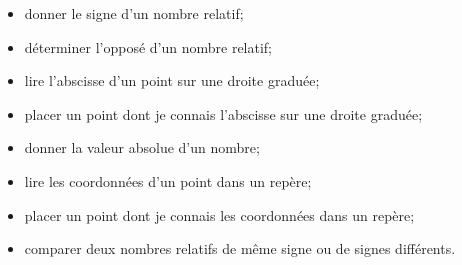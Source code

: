 \begin{acquis}
\begin{itemize}
\item donner le signe d'un nombre relatif;
\item déterminer l'opposé d'un nombre relatif;
\item lire l'abscisse d'un point sur une droite graduée;
\item placer un point dont je connais l'abscisse sur une droite graduée;
\item donner la valeur absolue d'un nombre;
\item lire les coordonnées d'un point dans un repère;
\item placer un point dont je connais les coordonnées dans un repère;
\item comparer deux nombres relatifs de même signe ou de signes différents.
\end{itemize}
\end{acquis}


